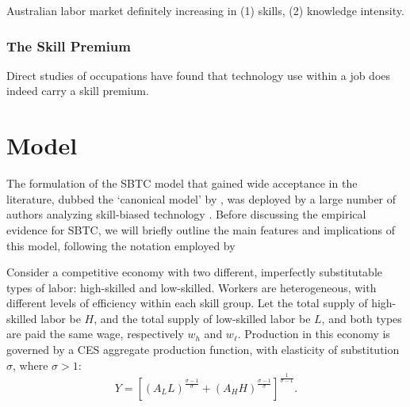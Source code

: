 Australian labor market definitely increasing in (1) skills, (2) knowledge intensity. \citet{Esposto2012} \citet{Esposto2011}

\cite{Cully1999} %

\cite{Barnes2002} %

\cite{Wooden2000} %

\cite{Card2001} %

\cite{Borland1999}
\cite{Borland2000}

\subsubsection{The Skill Premium}

Direct studies of occupations have found that technology use within a job does indeed carry a skill premium. \citet{Borland2004} 

\cite{Autor1998} %

\cite{Coelli2009}

\section{Model}

The formulation of the SBTC model that gained wide acceptance in the literature, dubbed the `canonical model' by \citet{Acemoglu2011},  was deployed by a large number of authors analyzing skill-biased technology \citep[e.g.]{Katz1992,Goldin2007}. %
Before discussing the empirical evidence for SBTC, we will briefly outline the main features and implications of this model, following the notation employed by \citet{Acemoglu2011}

Consider a competitive economy with two different, imperfectly substitutable types of labor: high-skilled and low-skilled. Workers are heterogeneous, with different levels of efficiency within each skill group. Let the total supply of high-skilled labor be $H$, and the total supply of low-skilled labor be $L$, and both types are paid the same wage, respectively $w_h$ and $w_\ell$. Production in this economy is governed by a CES aggregate production function, with elasticity of substitution $\sigma$, where $\sigma>1$:
\begin{equation}  \label{eq:prod}
Y = \left[
  \left(A_LL \right)^\frac{\sigma-1}{\sigma}
  +
  \left(A_HH \right)^\frac{\sigma-1}{\sigma}
  \right]^\frac{1}{\sigma-1}.
\end{equation}

